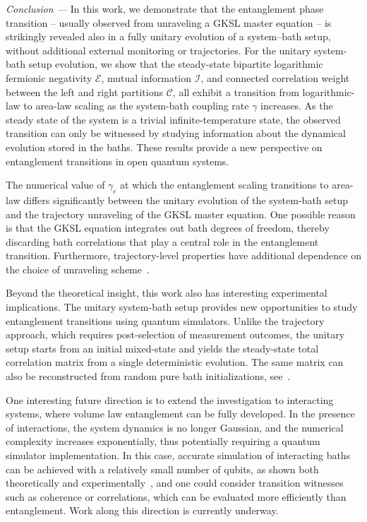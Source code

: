 \documentclass[reprint, superscriptaddress, aps, prl]{revtex4-2}
\begin{document}
\textit{Conclusion ---}
In this work, we demonstrate that the entanglement phase transition -- usually observed from unraveling a GKSL master equation -- is strikingly revealed also in a fully unitary evolution of a system–bath setup, without additional external monitoring or trajectories.
For the unitary system-bath setup evolution, we show that the steady-state bipartite logarithmic fermionic negativity $\mathcal{E}$, mutual information $\mathcal{I}$, and connected correlation weight between the left and right partitions $\mathcal{C}$, all exhibit a transition from logarithmic-law to area-law scaling as the system-bath coupling rate $\gamma$ increases.
As the steady state of the system is a trivial infinite-temperature state, the observed transition can only be witnessed by studying information about the dynamical evolution stored in the baths.
These results provide a new perspective on entanglement transitions in open quantum systems.

The numerical value of $\gamma_c$ at which the entanglement scaling transitions to area-law differs significantly between the unitary evolution of the system-bath setup and the trajectory unraveling of the GKSL master equation.
One possible reason is that the GKSL equation integrates out bath degrees of freedom, thereby discarding bath correlations that play a central role in the entanglement transition.
Furthermore, trajectory-level properties have additional dependence on the choice of unraveling scheme~\cite{PiccittoRossini2024}.

Beyond the theoretical insight, this work also has interesting experimental implications.
The unitary system-bath setup provides new opportunities to study entanglement transitions using quantum simulators.
Unlike the trajectory approach, which requires post-selection of measurement outcomes, the unitary setup starts from an initial mixed-state and yields the steady-state total correlation matrix from a single deterministic evolution.
The same matrix can also be reconstructed from random pure bath initializations, see~\cite{supp}.

One interesting future direction is to extend the investigation to interacting systems, where volume law entanglement can be fully developed.
In the presence of interactions, the system dynamics is no longer Gaussian, and the numerical complexity increases exponentially, thus potentially requiring a quantum simulator implementation.
In this case, accurate simulation of interacting baths can be achieved with a relatively small number of qubits, as shown both theoretically and experimentally~\cite{XuPoletti2022, XuPoletti2023, ZhangPoletti2024}, and one could consider transition witnesses such as coherence or correlations, which can be evaluated more efficiently than entanglement.
Work along this direction is currently underway.
\end{document}
